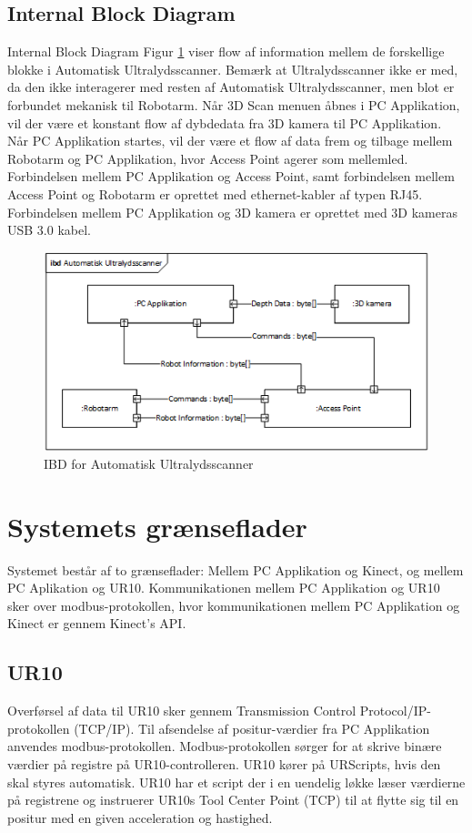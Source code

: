 \subsection{Internal Block Diagram}
Internal Block Diagram Figur \ref{IBD} viser flow af information mellem de forskellige blokke i Automatisk Ultralydsscanner.
Bemærk at Ultralydsscanner ikke er med, da den ikke interagerer med resten af Automatisk Ultralydsscanner, men blot er forbundet mekanisk til Robotarm.
Når 3D Scan menuen åbnes i PC Applikation, vil der være et konstant flow af dybdedata fra 3D kamera til PC Applikation.
Når PC Applikation startes, vil der være et flow af data frem og tilbage mellem Robotarm og PC Applikation, hvor Access Point agerer som mellemled. 
Forbindelsen mellem PC Applikation og Access Point, samt forbindelsen mellem Access Point og Robotarm er oprettet med ethernet-kabler af typen RJ45.
Forbindelsen mellem PC Applikation og 3D kamera er oprettet med 3D kameras USB 3.0 kabel. 

\begin{figure}[H]
    \centering
    \includegraphics[width=1\textwidth]{figurer/d/Design/IBD}
    \caption{IBD for Automatisk Ultralydsscanner}
    \label{IBD}
\end{figure}

\section{Systemets grænseflader}
Systemet består af to grænseflader: Mellem PC Applikation og Kinect, og mellem PC Aplikation og UR10. Kommunikationen mellem PC Applikation og UR10 sker over modbus-protokollen, hvor kommunikationen mellem PC Applikation og Kinect er gennem Kinect's API.

\subsection{UR10}
Overførsel af data til UR10 sker gennem Transmission Control Protocol/IP-protokollen (TCP/IP). Til afsendelse af positur-værdier fra PC Applikation anvendes modbus-protokollen. Modbus-protokollen sørger for at skrive binære værdier på registre på UR10-controlleren. UR10 kører på URScripts, hvis den skal styres automatisk. UR10 har et script der i en uendelig løkke læser værdierne på registrene og instruerer UR10s Tool Center Point (TCP) til at flytte sig til en positur med en given acceleration og hastighed.


